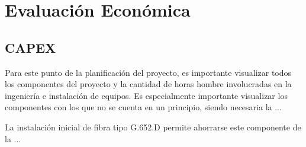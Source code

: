 \section{Evaluaci\'on Econ\'omica}\label{sec:evaluacion}

\subsection{CAPEX}

Para este punto de la planificación del proyecto, es importante
visualizar todos los componentes del proyecto y la cantidad de horas
hombre involucradas en la ingeniería e instalación de equipos. Es 
especialmente importante visualizar los componentes con los que no
se cuenta en un principio, siendo necesaria la ...

La instalación inicial de fibra tipo G.652.D permite ahorrarse este componente de la ...


 
 
 

